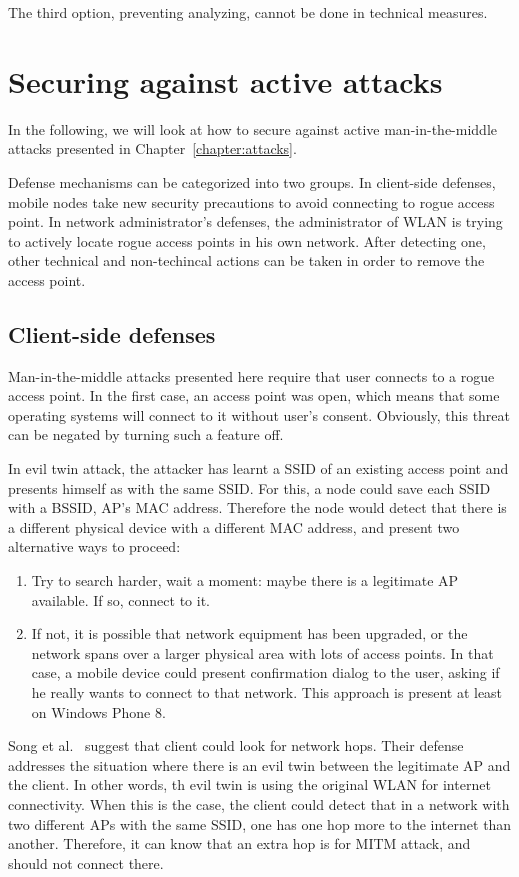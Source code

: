\documentclass[12pt,a4paper,oneside,pdftex]{report}
\begin{document}
The third option, preventing analyzing, cannot be done in technical measures. 


\section{Securing against active attacks}

In the following, we will look at how to secure against active man-in-the-middle attacks presented in Chapter~\ref{chapter:attacks}. 

Defense mechanisms can be categorized into two groups. In client-side defenses, mobile nodes take new security precautions to avoid connecting to rogue access point. In network administrator's defenses, the administrator of WLAN is trying to actively locate rogue access points in his own network. After detecting one, other technical and non-techincal actions can be taken in order to remove the access point.

\subsection{Client-side defenses}

Man-in-the-middle attacks presented here require that user connects to a rogue access point. In the first case, an access point was open, which means that some operating systems will connect to it without user's consent. Obviously, this threat can be negated by turning such a feature off. 

In evil twin attack, the attacker has learnt a SSID of an existing access point and presents himself as with the same SSID. For this, a node could save each SSID with a BSSID, AP's MAC address. Therefore the node would detect that there is a different physical device with a different MAC address, and present two alternative ways to proceed:
\begin{enumerate}
    \item Try to search harder, wait a moment: maybe there is a legitimate AP available. If so, connect to it.
    \item If not, it is possible that network equipment has been upgraded, or the network spans over a larger physical area with lots of access points. In that case, a mobile device could present confirmation dialog to the user, asking if he really wants to connect to that network. This approach is present at least on Windows Phone 8.
\end{enumerate}

Song et al.~\cite{song2010peeping} suggest that client could look for network hops. Their defense addresses the situation where there is an evil twin between the legitimate AP and the client. In other words, th evil twin is using the original WLAN for internet connectivity. When this is the case, the client could detect that in a network with two different APs with the same SSID, one has one hop more to the internet than another. Therefore, it can know that an extra hop is for MITM attack, and should not connect there.
\end{document}
